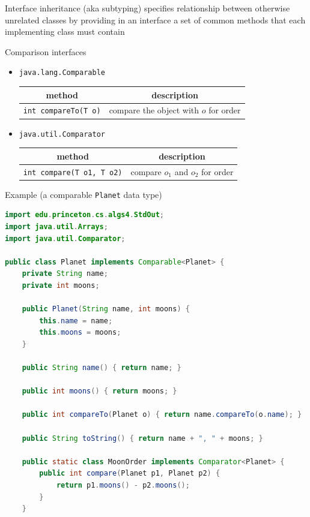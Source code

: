 \documentclass[8pt,a4paper,compress]{beamer}
\begin{document}
\begin{frame}[fragile]
\pause

Interface inheritance (aka subtyping) specifies relationship between otherwise unrelated classes by providing in an interface a set of common methods that each implementing class must contain

\pause
\bigskip

Comparison interfaces
\begin{itemize}
\item \lstinline{java.lang.Comparable}
\begin{center}
\begin{tabular}{cc}
method & description \\ \hline
\lstinline$int compareTo(T o)$ & compare the object with $o$ for order
\end{tabular} 
\end{center}

\item \lstinline{java.util.Comparator}
\begin{center}
\begin{tabular}{cc}
method & description \\ \hline
\lstinline$int compare(T o1, T o2)$ & compare $o_1$ and $o_2$ for order
\end{tabular} 
\end{center}
\end{itemize}
\end{frame}

\begin{frame}[fragile]
\pause

Example (a comparable \lstinline{Planet} data type)
\begin{lstlisting}[language=Java]
import edu.princeton.cs.algs4.StdOut;
import java.util.Arrays;
import java.util.Comparator;

public class Planet implements Comparable<Planet> {
    private String name;
    private int moons;

    public Planet(String name, int moons) {
        this.name = name;
        this.moons = moons;
    }
    
    public String name() { return name; }

    public int moons() { return moons; }

    public int compareTo(Planet o) { return name.compareTo(o.name); }
    
    public String toString() { return name + ", " + moons; }

    public static class MoonOrder implements Comparator<Planet> {
        public int compare(Planet p1, Planet p2) {
            return p1.moons() - p2.moons();
        }
    }
\end{lstlisting}
\end{frame}
\end{document}
